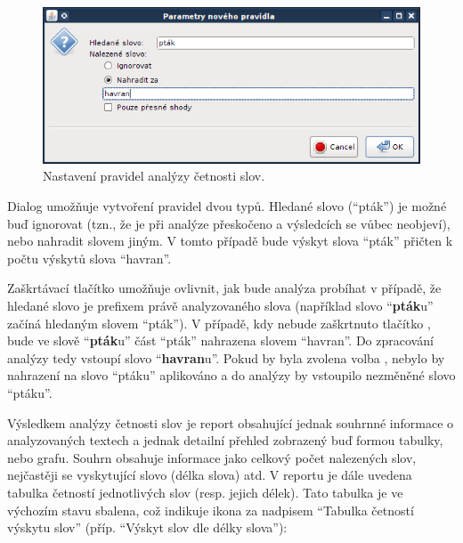 \documentclass[dp.tex]{subfiles}
\begin{document}
\begin{figure}[H]
\centering
\includegraphics[max width=\textwidth,keepaspectratio=true]{imgs-60-aplikace/gui-word-analysis-rules-dialog}
\caption{Nastavení pravidel analýzy četnosti slov.}
\label{fig:gui-word-analysis-rules-dialog}
\end{figure}

Dialog umožňuje vytvoření pravidel dvou typů. Hledané slovo (\enquote{pták}) je možné buď ignorovat (tzn., že je při analýze přeskočeno a výsledcích se vůbec neobjeví), nebo nahradit slovem jiným. V tomto případě bude výskyt slova \enquote{pták} přičten k počtu výskytů slova \enquote{havran}.

Zaškrtávací tlačítko  umožňuje ovlivnit, jak bude analýza probíhat v případě, že hledané slovo je prefixem právě analyzovaného slova (například slovo \enquote{\textbf{pták}u} začíná hledaným slovem \enquote{pták}). V případě, kdy nebude zaškrtnuto tlačítko , bude ve slově \enquote{\textbf{pták}u} část \enquote{pták} nahrazena slovem \enquote{havran}. Do zpracování analýzy tedy vstoupí slovo \enquote{\textbf{havran}u}. Pokud by byla zvolena volba , nebylo by nahrazení na slovo \enquote{ptáku} aplikováno a do analýzy by vstoupilo nezměněné slovo \enquote{ptáku}.


Výsledkem analýzy četnosti slov je report obsahující jednak souhrnné informace o analyzovaných textech a jednak detailní přehled zobrazený buď formou tabulky, nebo grafu. Souhrn obsahuje informace jako celkový počet nalezených slov, nejčastěji se vyskytující slovo (délka slova) atd. V reportu je dále uvedena tabulka četností jednotlivých slov (resp. jejich délek). Tato tabulka je ve výchozím stavu sbalena, což indikuje ikona za nadpisem \enquote{Tabulka četností výskytu slov} (příp. \enquote{Výskyt slov dle délky slova}):
\end{document}
